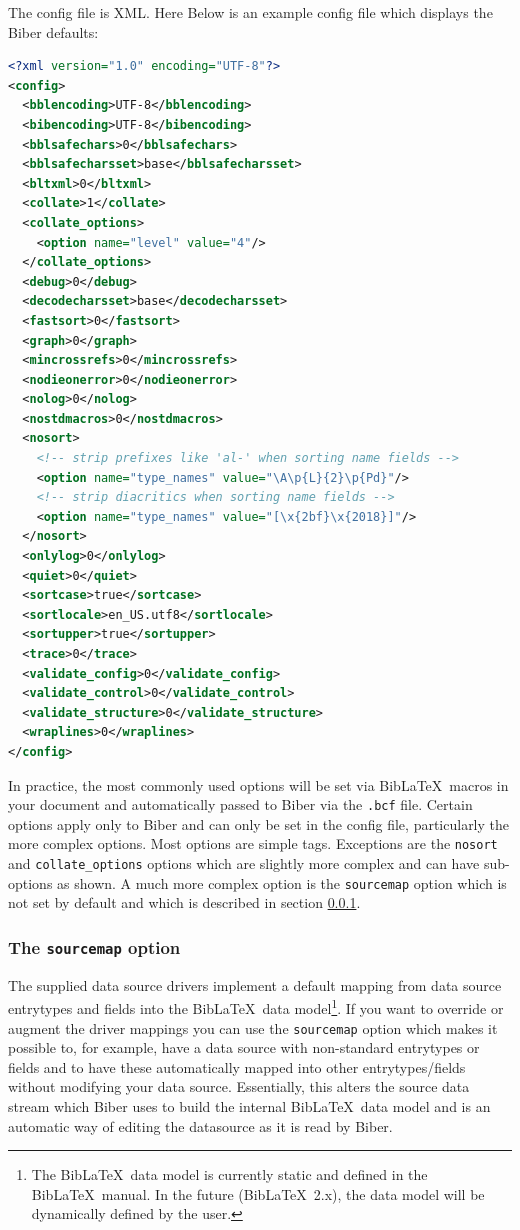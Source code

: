 \documentclass{ltxdockit}
\begin{document}
\noindent The config file is XML. Here Below is
an example config file which displays the Biber defaults:

\begin{lstlisting}[language=xml]
<?xml version="1.0" encoding="UTF-8"?>
<config>
  <bblencoding>UTF-8</bblencoding>
  <bibencoding>UTF-8</bibencoding>
  <bblsafechars>0</bblsafechars>
  <bblsafecharsset>base</bblsafecharsset>
  <bltxml>0</bltxml>
  <collate>1</collate>
  <collate_options>
    <option name="level" value="4"/>
  </collate_options>
  <debug>0</debug>
  <decodecharsset>base</decodecharsset>
  <fastsort>0</fastsort>
  <graph>0</graph>
  <mincrossrefs>0</mincrossrefs>
  <nodieonerror>0</nodieonerror>
  <nolog>0</nolog>
  <nostdmacros>0</nostdmacros>
  <nosort>
    <!-- strip prefixes like 'al-' when sorting name fields -->
    <option name="type_names" value="\A\p{L}{2}\p{Pd}"/>
    <!-- strip diacritics when sorting name fields -->
    <option name="type_names" value="[\x{2bf}\x{2018}]"/>
  </nosort>
  <onlylog>0</onlylog>
  <quiet>0</quiet>
  <sortcase>true</sortcase>
  <sortlocale>en_US.utf8</sortlocale>
  <sortupper>true</sortupper>
  <trace>0</trace>
  <validate_config>0</validate_config>
  <validate_control>0</validate_control>
  <validate_structure>0</validate_structure>
  <wraplines>0</wraplines>
</config>
\end{lstlisting}

\noindent In practice, the most commonly used options will be set via
Bib\LaTeX\ macros in your document and automatically passed to Biber
via the \verb+.bcf+ file. Certain options apply only to Biber and can
only be set in the config file, particularly the more complex
options. Most options are simple tags. Exceptions are the
\verb+nosort+ and \verb+collate_options+ options which are slightly
more complex and can have sub-options as shown. A much more complex
option is the \verb+sourcemap+ option which is not set by default and
which is described in section \ref{map}.

\subsubsection{The \texttt{sourcemap} option}\label{map}

The supplied data source drivers implement a default mapping from data
source entrytypes and fields into the Bib\LaTeX\ data
model\footnote{The Bib\LaTeX\ data model is currently static and
  defined in the Bib\LaTeX\ manual. In the future (Bib\LaTeX\
  2.x), the data model will be dynamically defined by the user.}. If you
want to override or augment the driver mappings you can use the \verb+sourcemap+
option which makes it possible to, for example, have a data source with
non-standard entrytypes or fields and to have these automatically mapped
into other entrytypes/fields without modifying your data source.
Essentially, this alters the source data stream which
Biber uses to build the internal Bib\LaTeX\ data model and is an automatic
way of editing the datasource as it is read by Biber.
\end{document}
